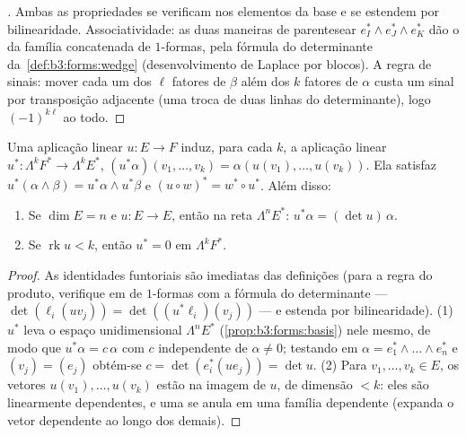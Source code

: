 \begin{proof}[\omnameProof]
Ambas as propriedades se verificam nos elementos da base e se estendem
por bilinearidade. Associatividade: as duas maneiras de parentesear
$e_I^* \wedge e_J^* \wedge e_K^*$ dão o  da família concatenada de $1$-formas,
pela fórmula do determinante da~\cref{def:b3:forms:wedge} (desenvolvimento de
Laplace por blocos). A regra de sinais: mover cada um dos $\ell$
fatores de $\beta$ além dos $k$ fatores de $\alpha$ custa um
sinal por transposição adjacente (uma troca de duas linhas do
determinante), logo $(-1)^{k\ell}$ ao todo.
\end{proof}

\begin{proposition}
\label{prop:b3:forms:linearpullback}
Uma aplicação linear $u\colon E \to F$ induz, para cada $k$, a aplicação linear
$u^*\colon \Lambda^kF^* \to \Lambda^kE^*$, $(u^*\alpha)(v_1, \dots, v_k) = \alpha(u(v_1), \dots,
u(v_k))$. Ela satisfaz $u^*(\alpha \wedge \beta) = u^*\alpha
\wedge u^*\beta$ e $(u \circ w)^* = w^* \circ u^*$. Além disso:
\begin{enumerate}
  \item Se $\dim E = n$ e $u\colon E \to E$, então na reta $\Lambda^nE^*$: $u^*\alpha = (\det u)\,\alpha$.
  \item Se $\operatorname{rk}u < k$, então $u^* = 0$ em $\Lambda^kF^*$.
\end{enumerate}
\end{proposition}

\begin{proof}
As identidades funtoriais são imediatas das definições (para a regra do
produto, verifique em  de $1$-formas com a fórmula
do determinante --- $\det(\ell_i(uv_j)) =
\det((u^*\ell_i)(v_j))$ --- e estenda por bilinearidade).
(1) $u^*$ leva o espaço unidimensional $\Lambda^nE^*$ (\cref{prop:b3:forms:basis}) nele
mesmo, de modo que $u^*\alpha =
c\,\alpha$ com $c$ independente de $\alpha \neq 0$; testando em
$\alpha = e_1^* \wedge \dots \wedge e_n^*$ e $(v_j) =
(e_j)$ obtém-se $c = \det(e_i^*(ue_j)) = \det u$.
(2) Para $v_1, \dots, v_k \in E$, os vetores $u(v_1), \dots,
u(v_k)$ estão na imagem de $u$, de dimensão
$< k$: eles são linearmente dependentes, e uma  se
anula em uma família dependente (expanda o vetor dependente ao longo dos
demais).
\end{proof}

